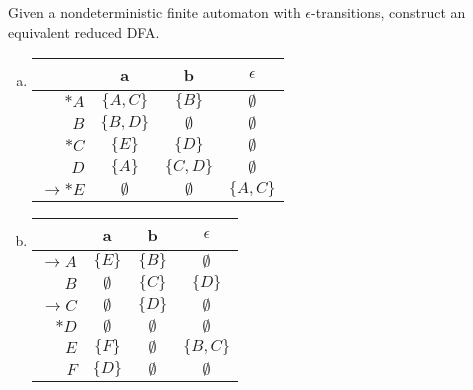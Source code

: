 \documentclass[a4paper,12pt]{amsart}
\begin{document}
\medskip\begin{problem}

    Given a nondeterministic finite automaton with  $\epsilon$-transitions, construct an equivalent reduced DFA.
    
    
    \begin{multicols}{2}
    
        \begin{enumerate}[(a)]

            \item \begin{tabular}{ r | c c c }
            & a & b & $\epsilon$ \\ \hline
            $\ast A$ & $\{A,C\}$ & $\{B\}$ & $\emptyset$ \\
            $B$ & $\{B,D\}$ & $\emptyset$ & $\emptyset$ \\
            $\ast C$ & $\{E\}$ & $\{D\}$ & $\emptyset$ \\
            $D$ & $\{A\}$ & $\{C,D\}$ & $\emptyset$ \\
            $\to\ast E$ & $\emptyset$ & $\emptyset$ & $\{A,C\}$
            \end{tabular}
            
            \item \begin{tabular}{ r | c c c }
            & a & b & $\epsilon$ \\ \hline
            $\to A$ & $\{E\}$ & $\{B\}$ & $\emptyset$ \\
            $B$ & $\emptyset$ & $\{C\}$ & $\{D\}$ \\
            $\to C$ & $\emptyset$ & $\{D\}$ & $\emptyset$ \\
            $\ast D$ & $\emptyset$ & $\emptyset$ & $\emptyset$ \\
            $E$ & $\{F\}$ & $\emptyset$ & $\{B,C\}$\\
            $F$ & $\{D\}$ & $\emptyset$ & $\emptyset$
            \end{tabular}
    
        \end{enumerate}
    
    \end{multicols}

\end{problem}
\end{document}
